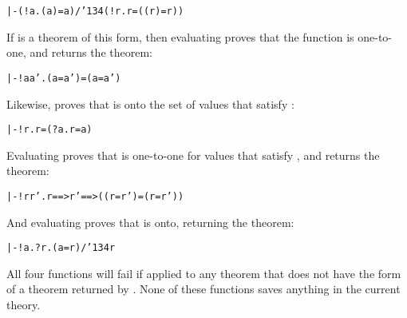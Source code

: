 {\def\bk{\char'134}
\begin{hol}\begin{alltt}
   |- (!a. ( a) = a) /\bk (!r.  r = (( r) = r))
\end{alltt}\end{hol}}

\noindent If  is a theorem of this form, then evaluating
 proves that the function  is
one-to-one, and returns the theorem:

\begin{hol}\begin{alltt}
   |- !a a'. ( a =  a') = (a = a')
\end{alltt}\end{hol}

\noindent Likewise,  proves that  is
onto the set of values that satisfy :

{\def\bk{\char'134}
\begin{hol}\begin{alltt}
   |- !r.  r = (?a. r =  a)
\end{alltt}\end{hol}}

\noindent Evaluating  proves that 
is one-to-one for values that satisfy , and returns the theorem:

{\def\bk{\char'134}
\begin{hol}\begin{alltt}
   |- !r r'.  r ==>  r' ==> (( r =  r') = (r = r'))
\end{alltt}\end{hol}}

\noindent And evaluating  proves that 
is onto, returning the theorem:

{\def\bk{\char'134}
\begin{hol}\begin{alltt}
   |- !a. ?r. (a =  r) /\bk {} r
\end{alltt}\end{hol}}

\noindent All four functions will fail if applied to any theorem that does not
have the form of a theorem returned by .
None of these functions saves anything in the current theory.



